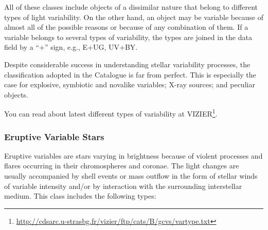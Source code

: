 All of these classes include objects of a dissimilar nature that belong
to different types of light variability. On the other hand, an object
may be variable because of almost all of the possible reasons or because
of any combination of them. If a variable belongs to several types of
variability, the types are joined in the data field by a ``+'' sign, e.g.,
E+UG, UV+BY.

Despite considerable success in understanding stellar variability
processes, the classification adopted in the Catalogue is far from
perfect. This is especially the case for explosive, symbiotic and
novalike variables; X-ray sources; and peculiar objects.

You can read about latest different types of variability at VIZIER\footnote{
\url{http://cdsarc.u-strasbg.fr/vizier/ftp/cats/B/gcvs/vartype.txt}}.

\subsubsection{Eruptive Variable Stars}\label{eruptive-variable-stars}

Eruptive variables are stars varying in brightness because of violent
processes and flares occurring in their chromospheres and coronae. The
light changes are usually accompanied by shell events or mass outflow in
the form of stellar winds of variable intensity and/or by interaction
with the surrounding interstellar medium. This class includes the
following types:

